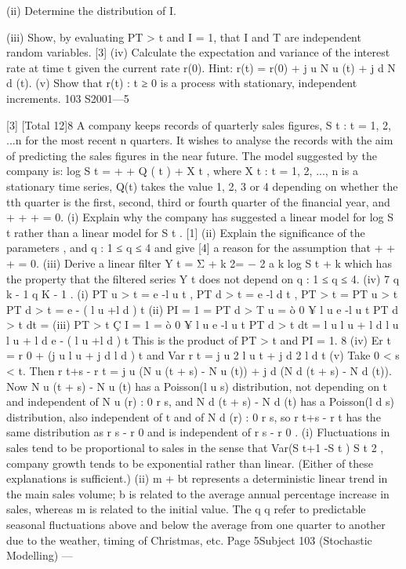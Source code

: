 \documentclass[a4paper,12pt]{article}
\begin{document}
\begin{enumerate}
(ii) Determine the distribution of I.

(iii) Show, by evaluating P{T > t and I = 1}, that I and T are independent
random variables.
[3]
(iv) Calculate the expectation and variance of the interest rate at time t given
the current rate r(0).
Hint: r(t) = r(0) + j u N u (t) + j d N d (t).
(v)
Show that {r(t) : t ≥ 0} is a process with stationary, independent
increments.
103 S2001—5

[3]
[Total 12]8
A company keeps records of quarterly sales figures, {S t : t = 1, 2, ...n} for the most
recent n quarters. It wishes to analyse the records with the aim of predicting the
sales figures in the near future.
The model suggested by the company is:
log S t = \mu + \betat + \theta Q ( t ) + X t ,
where {X t : t = 1, 2, ..., n} is a stationary time series, Q(t) takes the value 1, 2, 3 or
4 depending on whether the tth quarter is the first, second, third or fourth
quarter of the financial year, and  +  +  +  = 0.
(i) Explain why the company has suggested a linear model for log S t rather
than a linear model for S t .
[1]
(ii) Explain the significance of the parameters \mu, \beta and {\theta q : 1 ≤ q ≤ 4} and give
[4]
a reason for the assumption that  +  +  +  = 0.
(iii) Derive a linear filter Y t = Σ + k 2= − 2 a k log S t + k which has the property that the
filtered series {Y t } does not depend on {\theta q : 1 ≤ q ≤ 4}.
(iv)
7
q k - 1
q K - 1
.
(i) P{T u > t} = e -l u t , P{T d > t} = e -l d t , P{T > t} = P{T u > t} P{T d > t} = e - ( l u +l d ) t
(ii) P{I = 1} = P{T d > T u } = ò 0 ¥ l u e -l u t P{T d > t} dt =
(iii) P{T > t Ç I = 1} = ò 0 ¥ l u e -l u t P{T d > t} dt =
l u
l u + l d
l u
l u + l d
e - ( l u +l d ) t
This is the product of P{T > t} and P{I = 1}.
8
(iv) Er t = r 0 + (j u l u + j d l d ) t and Var r t = j u 2 l u t + j d 2 l d t
(v) Take 0 < s < t. Then r t+s - r t = j u (N u (t + s) - N u (t)) + j d (N d (t + s) - N d (t)).
Now N u (t + s) - N u (t) has a Poisson(l u s) distribution, not depending on t
and independent of {N u (r) : 0 \leq r \leq s}, and N d (t + s) - N d (t) has a
Poisson(l d s) distribution, also independent of t and of {N d (r) : 0 \leq r \leq s}, so
r t+s - r t has the same distribution as r s - r 0 and is independent of r s - r 0 .
(i) Fluctuations in sales tend to be proportional to sales in the sense that
Var(S t+1 -S t ) \mu S t 2 , company growth tends to be exponential rather than
linear. (Either of these explanations is sufficient.)
(ii) m + bt represents a deterministic linear trend in the main sales volume; b
is related to the average annual percentage increase in sales, whereas m is
related to the initial value.
The q q refer to predictable seasonal fluctuations above and below the
average from one quarter to another due to the weather, timing of
Christmas, etc.
Page 5Subject 103 (Stochastic Modelling) — 


\end{enumerate}
\end{document}
